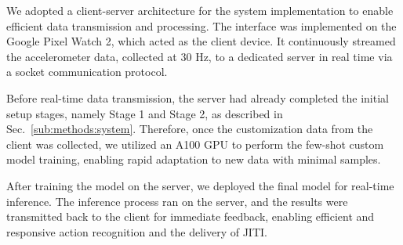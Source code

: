 We adopted a client-server architecture for the system implementation to enable efficient data transmission and processing. The interface was implemented on the Google Pixel Watch 2, which acted as the client device. It continuously streamed the accelerometer data, collected at 30 Hz, to a dedicated server in real time via a socket communication protocol. 

Before real-time data transmission, the server had already completed the initial setup stages, namely Stage 1 and Stage 2, as described in Sec.~\ref{sub:methods:system}. Therefore, once the customization data from the client was collected, we utilized an A100 GPU to perform the few-shot custom model training, enabling rapid adaptation to new data with minimal samples. 

After training the model on the server, we deployed the final model for real-time inference. The inference process ran on the server, and the results were transmitted back to the client for immediate feedback, enabling efficient and responsive action recognition and the delivery of JITI. 

